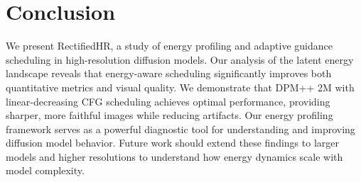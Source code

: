 \documentclass[10pt,twocolumn]{article}
\begin{document}
\section{Conclusion}
We present RectifiedHR, a study of energy profiling and adaptive guidance scheduling in high-resolution diffusion models. Our analysis of the latent energy landscape reveals that energy-aware scheduling significantly improves both quantitative metrics and visual quality. We demonstrate that DPM++ 2M with linear-decreasing CFG scheduling achieves optimal performance, providing sharper, more faithful images while reducing artifacts. Our energy profiling framework serves as a powerful diagnostic tool for understanding and improving diffusion model behavior. Future work should extend these findings to larger models and higher resolutions to understand how energy dynamics scale with model complexity.
\end{document}
